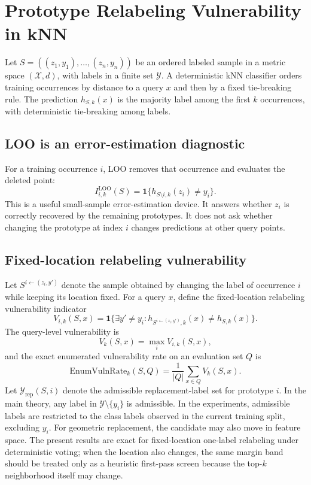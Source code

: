 \section{Prototype Relabeling Vulnerability in kNN}
\label{sec:problem}

Let $S=((z_1,y_1),\ldots,(z_n,y_n))$ be an ordered labeled sample in a metric space $(\mathcal X,d)$, with labels in a finite set $\mathcal Y$.  A deterministic kNN classifier orders training occurrences by distance to a query $x$ and then by a fixed tie-breaking rule.  The prediction $h_{S,k}(x)$ is the majority label among the first $k$ occurrences, with deterministic tie-breaking among labels.

\subsection{LOO is an error-estimation diagnostic}

For a training occurrence $i$, LOO removes that occurrence and evaluates the deleted point:
\[
    I^{\mathrm{LOO}}_{i,k}(S)
    =
    \mathbf 1\{h_{S\setminus i,k}(z_i)\ne y_i\}.
\]
This is a useful small-sample error-estimation device.  It answers whether $z_i$ is correctly recovered by the remaining prototypes.  It does not ask whether changing the prototype at index $i$ changes predictions at other query points.

\subsection{Fixed-location relabeling vulnerability}

Let $S^{i\leftarrow (z_i,y')}$ denote the sample obtained by changing the label of occurrence $i$ while keeping its location fixed.  For a query $x$, define the fixed-location relabeling vulnerability indicator
\[
    V_{i,k}(S,x)
    =
    \mathbf 1\{\exists y'\ne y_i:
    h_{S^{i\leftarrow (z_i,y')},k}(x)\ne h_{S,k}(x)\}.
\]
The query-level vulnerability is
\[
    V_k(S,x)=\max_i V_{i,k}(S,x),
\]
and the exact enumerated vulnerability rate on an evaluation set $Q$ is
\[
    \mathrm{EnumVulnRate}_k(S,Q)
    =
    \frac{1}{|Q|}\sum_{x\in Q} V_k(S,x).
\]
Let $\mathcal Y_{\mathrm{rep}}(S,i)$ denote the admissible replacement-label set for prototype $i$.  In the main theory, any label in $\mathcal Y\setminus\{y_i\}$ is admissible.  In the experiments, admissible labels are restricted to the class labels observed in the current training split, excluding $y_i$.  For geometric replacement, the candidate may also move in feature space.  The present results are exact for fixed-location one-label relabeling under deterministic voting; when the location also changes, the same margin band should be treated only as a heuristic first-pass screen because the top-$k$ neighborhood itself may change.

